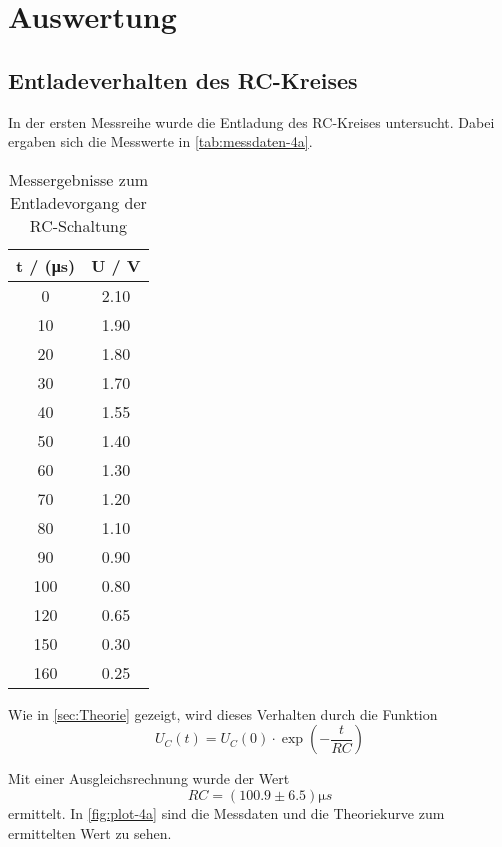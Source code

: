 \section{Auswertung}
\label{sec:Auswertung}

\subsection{Entladeverhalten des RC-Kreises}
\label{sec:4a-auswertung}

In der ersten Messreihe wurde die Entladung des RC-Kreises untersucht. Dabei ergaben sich
die Messwerte in \autoref{tab:messdaten-4a}.

\begin{table}
\centering
\caption{Messergebnisse zum Entladevorgang der RC-Schaltung}
\label{tab:messdaten-4a}
\begin{tabular}{c c}
\toprule
t / (\si{\micro s}) & U / \si{\volt} \\
\midrule
  0  	&2.10 \\
 10  	&1.90 \\
 20  	&1.80 \\
 30  	&1.70 \\
 40  	&1.55 \\
 50  	&1.40 \\
 60  	&1.30 \\
 70  	&1.20 \\
 80  	&1.10 \\
 90  	&0.90 \\
100  	&0.80 \\
120  	&0.65 \\
150  	&0.30 \\
160  	&0.25 \\
\bottomrule
\end{tabular}
\end{table}

Wie in \autoref{sec:Theorie} gezeigt, wird dieses Verhalten durch die Funktion
\begin{equation}
	U_C(t) = U_C(0) \cdot \exp\left(-\frac{t}{RC}\right)
\end{equation}

Mit einer Ausgleichsrechnung wurde der Wert
\begin{equation}
	RC = (100.9 \pm 6.5) \si{\micro s}
	\label{eqn:ergebnis-4a}
\end{equation}
ermittelt. In \autoref{fig:plot-4a} sind die Messdaten und die Theoriekurve zum ermittelten Wert zu sehen.

